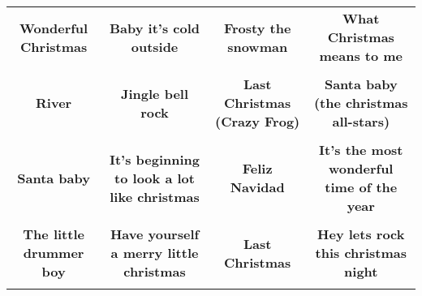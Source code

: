 \documentclass[12pt]{article} \usepackage{eso-pic, graphicx}
\newcommand{\background}[1]{%
\AddToShipoutPictureBG*{\texttt{[image: \#1]}}
}
\begin{document}
\tabcolsep=30.2pt \renewcommand{\arraystretch}{4.5}   \vspace*{4.3cm} \begin{center}  \begin{tabular}{c c c c}
\parbox{3cm}{\centering \textbf{Wonderful Christmas}}& 
\parbox{3cm}{\centering \textbf{Baby it’s cold outside}}& 
\parbox{3cm}{\centering \textbf{Frosty the snowman}}& 
\parbox{3cm}{\centering \textbf{What Christmas means to me}}\\ \\ 
\parbox{3cm}{\centering \textbf{River}}& 
\parbox{3cm}{\centering \textbf{Jingle bell rock}}& 
\parbox{3cm}{\centering \textbf{Last Christmas (Crazy Frog)}}& 
\parbox{3cm}{\centering \textbf{Santa baby (the christmas all-stars)}}\\ \\ 
\parbox{3cm}{\centering \textbf{Santa baby}}& 
\parbox{3cm}{\centering \textbf{It’s beginning to look a lot like christmas}}& 
\parbox{3cm}{\centering \textbf{Feliz Navidad}}& 
\parbox{3cm}{\centering \textbf{It’s the most wonderful time of the year}}\\ \\ 
\parbox{3cm}{\centering \textbf{The little drummer boy}}& 
\parbox{3cm}{\centering \textbf{Have yourself a merry little christmas}}& 
\parbox{3cm}{\centering \textbf{Last Christmas}}& 
\parbox{3cm}{\centering \textbf{Hey lets rock this christmas night}}\\ \\ 
\end{tabular} \background{discobingo.pdf} \end{center} 
\end{document}
